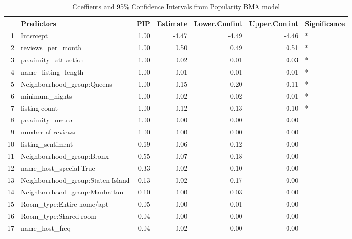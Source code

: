 \documentclass[10pt]{jmlr}%
\begin{document}
\begin{table}[ht]
	\centering
	\begin{tabular}{rlrrrrl}
	  \hline
	 & Predictors & PIP & Estimate & Lower.Confint & Upper.Confint & Significance \\ 
	  \hline
	1 & Intercept & 1.00 & -4.47 & -4.49 & -4.46 & * \\ 
	  2 & reviews\_per\_month & 1.00 & 0.50 & 0.49 & 0.51 & * \\ 
	  3 & proximity\_attraction & 1.00 & 0.02 & 0.01 & 0.03 & * \\ 
	  4 & name\_listing\_length & 1.00 & 0.01 & 0.01 & 0.01 & * \\ 
	  5 & Neighbourhood\_group:Queens & 1.00 & -0.15 & -0.20 & -0.11 & * \\ 
	  6 & minimum\_nights & 1.00 & -0.02 & -0.02 & -0.01 & * \\ 
	  7 & listing count & 1.00 & -0.12 & -0.13 & -0.10 & * \\ 
	  8 & proximity\_metro & 1.00 & 0.00 & 0.00 & 0.00 &  \\ 
	  9 & number of reviews & 1.00 & -0.00 & -0.00 & -0.00 &  \\ 
	  10 & listing\_sentiment & 0.69 & -0.06 & -0.12 & 0.00 &  \\ 
	  11 & Neighbourhood\_group:Bronx & 0.55 & -0.07 & -0.18 & 0.00 &  \\ 
	  12 & name\_host\_special:True & 0.33 & -0.02 & -0.10 & 0.00 &  \\ 
	  13 & Neighbourhood\_group:Staten Island & 0.13 & -0.02 & -0.17 & 0.00 &  \\ 
	  14 & Neighbourhood\_group:Manhattan & 0.10 & -0.00 & -0.03 & 0.00 &  \\ 
	  15 & Room\_type:Entire home/apt & 0.05 & -0.00 & -0.01 & 0.00 &  \\ 
	  16 & Room\_type:Shared room & 0.04 & -0.00 & 0.00 & 0.00 &  \\ 
	  17 & name\_host\_freq & 0.04 & -0.02 & 0.00 & 0.00 &  \\ 
	   \hline
	\end{tabular}
	\caption{Coeffients and 95\% Confidence Intervals from Popularity BMA model} 
	\end{table}
	

\newpage



\end{document}
